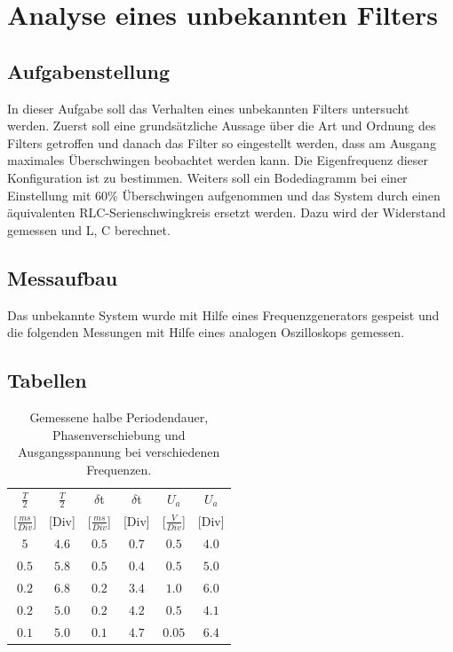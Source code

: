 \documentclass[12pt,a4paper,ngerman]{article}
\begin{document}


%
%

\section{Analyse eines unbekannten Filters}
\subsection{Aufgabenstellung}
In dieser Aufgabe soll das Verhalten eines unbekannten Filters untersucht werden. Zuerst soll eine grundsätzliche Aussage über die Art und Ordnung des Filters getroffen und danach das Filter so eingestellt werden, dass am Ausgang maximales Überschwingen beobachtet werden kann. 
Die Eigenfrequenz dieser Konfiguration ist zu bestimmen. Weiters soll ein Bodediagramm bei einer Einstellung mit 60\% Überschwingen aufgenommen und das System durch einen äquivalenten RLC-Serienschwingkreis ersetzt werden. Dazu wird der Widerstand gemessen und L, C berechnet.

\subsection{Messaufbau}

Das unbekannte System wurde mit Hilfe eines Frequenzgenerators gespeist und die folgenden Messungen mit Hilfe eines analogen Oszilloskops gemessen. 

\subsection{Tabellen}
\begin{table}[H]
\begin{center}
\begin{tabular}{ |c|c||c|c||c|c| }
  \hline
    $\frac{T}{2}$ & $\frac{T}{2}$ & $\delta$t & $\delta$t & $U_a$ & $U_a$\\

    [$\frac{ms}{Div}$] & [Div] & [$\frac{ms}{Div}$] & [Div] & [$\frac{V}{Div}$] & [Div]\\
  \hline
$5$ & $4.6$ & $0.5$ & $0.7$ & $0.5$ & $4.0$ \\
  \hline
$0.5$ & $5.8$ & $0.5$ & $0.4$ & $0.5$ & $5.0$ \\
  \hline
$0.2$ & $6.8$ & $0.2$ & $3.4$ & $1.0$ & $6.0$ \\
  \hline
$0.2$ & $5.0$ & $0.2$ & $4.2$ & $0.5$ & $4.1$ \\
  \hline
$0.1$ & $5.0$ & $0.1$ & $4.7$ & $0.05$ & $6.4$ \\
  \hline
\end{tabular}
\caption{Gemessene halbe Periodendauer, Phasenverschiebung und Ausgangsspannung bei verschiedenen Frequenzen.}
\end{center}
\label{tab:1}
\end{table}
\end{document}

